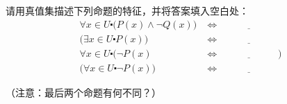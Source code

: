 请用真值集描述下列命题的特征，并将答案填入空白处：
\begin{align*}
    \forall x \in U \centerdot \big(P(x) \land \neg Q(x)\big) & \iff \underline{\qquad\qquad\qquad} \\
    \big(\exists x \in U \centerdot P(x)\big) & \iff \underline{\qquad\qquad\qquad} \\
    \forall x \in U \centerdot \big(\neg P(x) & \iff \underline{\qquad\qquad\qquad}\big) \\
    \big(\forall x \in U \centerdot \neg P(x)\big) & \iff \underline{\qquad\qquad\qquad}
\end{align*}

（注意：最后两个命题有何不同？）
